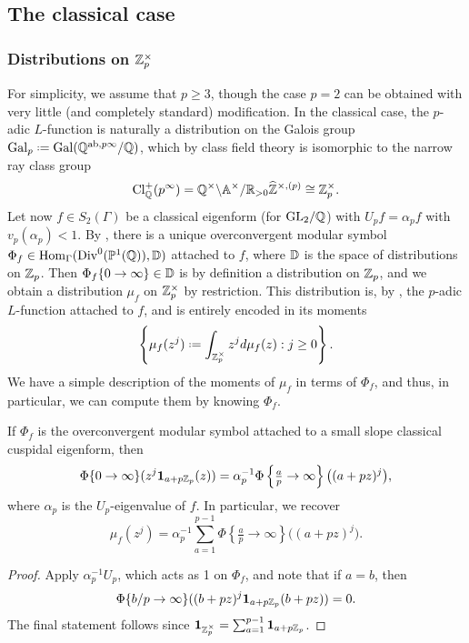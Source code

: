 \documentclass[a4paper,11pt]{article}
\numberwithin{equation}{section}
\begin{document}
\subsection{The classical case}
\subsubsection{Distributions on $\mathbb{Z}_p^\times$}

For simplicity, we assume that $p \geq 3$, though the case $p = 2$ can be obtained with very little (and completely standard) modification. In the classical case, the $p$-adic $L$-function is naturally a distribution on the Galois group $\mathrm{Gal}_p \defeq \mathrm{Gal}(\Q^{\mathrm{ab},p\infty}/\Q)$, which by class field theory is isomorphic to the narrow ray class group 
\[
	\mathrm{Cl}_{\mathbb{Q}}^+(p^\infty) = \mathbb{Q}^\times\backslash \mathbb{A}^\times/\mathbb{R}_{>0}\widehat{\mathbb{Z}}^{\times,(p)} \cong \mathbb{Z}_p^\times.
\]
Let now $f \in S_2(\Gamma)$ be a classical eigenform (for $\mathrm{GL}_2/\mathbb{Q}$) with $U_pf = \alpha_p f$ with $v_p(\alpha_p) < 1$. By \cite{PS11}, there is a unique overconvergent modular symbol $\Phi_f \in \mathrm{Hom}_\Gamma(\mathrm{Div}^0(\mathbb{P}^1(\mathbb{Q})),\mathbb{D})$ attached to $f$, where $\mathbb{D}$ is the space of distributions on $\mathbb{Z}_p$. Then $\Phi_f\{0 \to \infty\} \in \mathbb{D}$ is by definition a distribution on $\mathbb{Z}_p$, and we obtain a distribution $\mu_f$ on $\mathbb{Z}_p^\times$ by restriction. This distribution is, by \cite{PS11}, the $p$-adic $L$-function attached to $f$, and is entirely encoded in its moments 
\[
\left\{\mu_f(z^j) \defeq \int_{\Zp^\times} z^j d\mu_f(z) : j \geq 0\right\}.
\] We have a simple description of the moments of $\mu_f$ in terms of $\Phi_f$, and thus, in particular, we can compute them by knowing $\Phi_f$.

\begin{proposition}\label{prop:apply Up}
	If $\Phi_f$ is the overconvergent modular symbol attached to a small slope classical cuspidal eigenform, then
	\[
		\Phi\{0\rightarrow\infty\}(z^j \mathbf{1}_{a+p\mathbb{Z}_p}(z)) = \alpha_p^{-1}\Phi\left\{\tfrac{a}{p} \rightarrow \infty\right\}\big((a+pz)^j\big),
	\]
     where $\alpha_p$ is the $U_p$-eigenvalue of $f$. In particular, we recover
     \[
     	\mu_f(z^j) = \alpha_p^{-1}\sum_{a=1}^{p-1} \Phi\left\{\tfrac{a}{p} \rightarrow \infty\right\}\big((a+pz)^j\big).
     \]
\end{proposition}
\begin{proof}
Apply $\alpha_p^{-1}U_p$, which acts as 1 on $\Phi_f$, and note that if $a = b$, then
\[
\Phi\{b/p \rightarrow \infty\}((b+pz)^j\mathbf{1}_{a+p\mathbb{Z}_p}(b+pz)) = 0. \qedhere
\]
The final statement follows since $\mathbf{1}_{\mathbb{Z}_p^\times} = \sum_{a=1}^{p-1}\mathbf{1}_{a+p\mathbb{Z}_p}$.
\end{proof}
\end{document}
